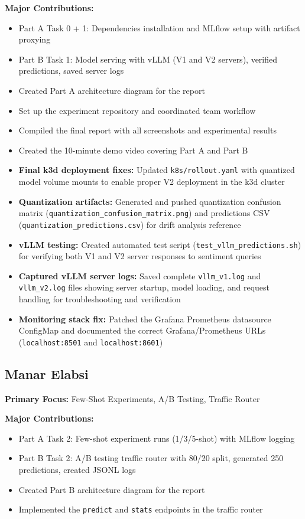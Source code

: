 \documentclass[11pt,a4paper]{article}
\begin{document}
\textbf{Major Contributions:}
\begin{itemize}
\item Part A Task 0 + 1: Dependencies installation and MLflow setup with artifact proxying
\item Part B Task 1: Model serving with vLLM (V1 and V2 servers), verified predictions, saved server logs
\item Created Part A architecture diagram for the report
\item Set up the experiment repository and coordinated team workflow
\item Compiled the final report with all screenshots and experimental results
\item Created the 10-minute demo video covering Part A and Part B
\item \textbf{Final k3d deployment fixes:} Updated \texttt{k8s/rollout.yaml} with quantized model volume mounts to enable proper V2 deployment in the k3d cluster
\item \textbf{Quantization artifacts:} Generated and pushed quantization confusion matrix (\texttt{quantization\_confusion\_matrix.png}) and predictions CSV (\texttt{quantization\_predictions.csv}) for drift analysis reference
\item \textbf{vLLM testing:} Created automated test script (\texttt{test\_vllm\_predictions.sh}) for verifying both V1 and V2 server responses to sentiment queries
\item \textbf{Captured vLLM server logs:} Saved complete \texttt{vllm\_v1.log} and \texttt{vllm\_v2.log} files showing server startup, model loading, and request handling for troubleshooting and verification
\item \textbf{Monitoring stack fix:} Patched the Grafana Prometheus datasource ConfigMap and documented the correct Grafana/Prometheus URLs (\texttt{localhost:8501} and \texttt{localhost:8601})
\end{itemize}

\subsection{Manar Elabsi}

\textbf{Primary Focus:} Few-Shot Experiments, A/B Testing, Traffic Router

\textbf{Major Contributions:}
\begin{itemize}
\item Part A Task 2: Few-shot experiment runs (1/3/5-shot) with MLflow logging
\item Part B Task 2: A/B testing traffic router with 80/20 split, generated 250 predictions, created JSONL logs
\item Created Part B architecture diagram for the report
\item Implemented the \texttt{predict} and \texttt{stats} endpoints in the traffic router
\end{itemize}
\end{document}

